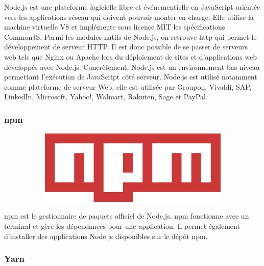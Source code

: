 \documentclass{article}
\begin{document}
Node.js est une plateforme logicielle libre et événementielle en JavaScript orientée vers les applications réseau qui doivent pouvoir monter en charge. 
Elle utilise la machine virtuelle V8 et implémente sous licence MIT les spécifications CommonJS.
Parmi les modules natifs de Node.js, on retrouve http qui permet le développement de serveur HTTP. Il est donc possible de se passer de serveurs web tels que Nginx ou Apache lors du déploiement de sites et d'applications web développés avec Node.js.
Concrètement, Node.js est un environnement bas niveau permettant l’exécution de JavaScript côté serveur.
Node.js est utilisé notamment comme plateforme de serveur Web, elle est utilisée par Groupon, Vivaldi, SAP, LinkedIn, Microsoft, Yahoo!, Walmart, Rakuten, Sage et PayPal.


\subsubsection{npm}

\begin{figure}[h!]
	\centering
  	\begin{subfigure}[b]{0.2\linewidth}
    \includegraphics[width=\linewidth]{npm.png}
  	\end{subfigure}
\end{figure}

npm est le gestionnaire de paquets officiel de Node.js. npm fonctionne avec un terminal et gère les dépendances pour une application. Il permet également d'installer des applications Node.js disponibles sur le dépôt npm.
\newpage
\subsubsection{Yarn}
\end{document}
